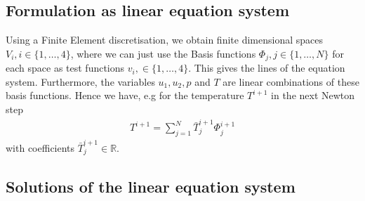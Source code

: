 \documentclass{article}
\begin{document}
\subsection{Formulation as linear equation system}
Using a Finite Element discretisation, we obtain finite dimensional spaces $V_i,i\in\{1,\dots,4\}$, where we can just use the Basis functions $\Phi_j,j\in \{1,\dots,N\}$ for each space as test functions $v_i,\in\{1,\dots,4\}$. This gives the lines of the equation system. Furthermore, the variables $u_1,u_2,p$ and $T$ are linear combinations of these basis functions. Hence we have, e.g for the temperature $T^{i+1}$ in the next Newton step
\begin{align*}
T^{i+1} = \sum\limits_{j=1}^{N} \bar{T}_j^{i+1}\Phi_j^{i+1}
\end{align*}
with coefficients $\bar{T}_j^{i+1} \in \mathbb{R}$. 
\subsection{Solutions of the linear equation system}
\end{document}
